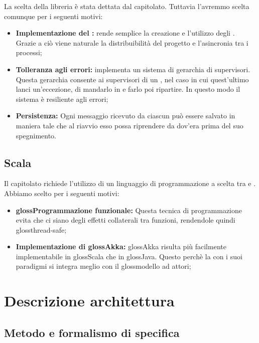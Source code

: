 \documentclass{scalatekids-article}
\begin{document}
La scelta della libreria  è stata dettata dal capitolato. Tuttavia
l'avremmo scelta comunque per i seguenti motivi:
\begin{itemize}
\item\textbf{Implementazione del :} 
  rende semplice la creazione e l'utilizzo degli . Grazie a ciò
  viene naturale la distribuibilità del progetto e l'asincronia tra i processi;
\item\textbf{Tolleranza agli errori:}  implementa un sistema di
  gerarchia di supervisori. Questa gerarchia consente ai supervisori di un
  , nel caso in cui quest'ultimo lanci un'eccezione, di mandarlo
  in  e farlo poi ripartire. In questo modo il sistema è resiliente
  agli errori;
\item\textbf{Persistenza:} Ogni messaggio ricevuto da ciascun 
  può essere salvato in maniera tale che al riavvio esso possa riprendere da
  dov'era prima del suo spegnimento.
\end{itemize}

\subsection{Scala}

Il capitolato richiede l'utilizzo di un linguaggio di programmazione a scelta
tra  e . Abbiamo scelto  per i seguenti
motivi:

\begin{itemize}
\item\textbf{gloss{Programmazione funzionale}:} Questa tecnica di
  programmazione evita che ci siano degli effetti collaterali tra funzioni,
  rendendole quindi gloss{thread-safe};
\item\textbf{Implementazione di gloss{Akka}:} gloss{Akka} risulta più
  facilmente implementabile in gloss{Scala} che in gloss{Java}. Questo perchè
  la  con i suoi paradigmi si integra meglio
  con il gloss{modello ad attori};%
\end{itemize}

\section{Descrizione architettura}

\subsection{Metodo e formalismo di specifica}
\end{document}
